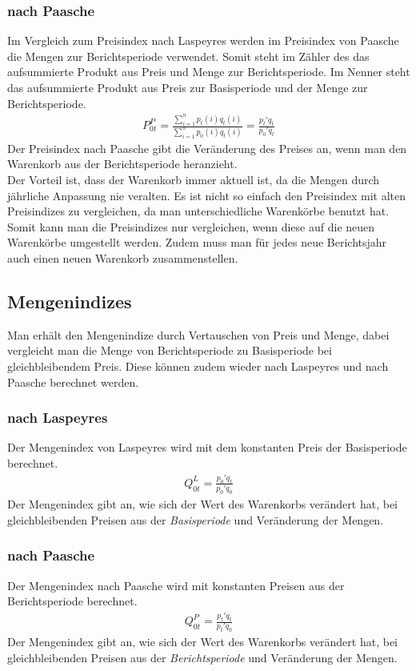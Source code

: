 \documentclass[a4paper]{article}
\begin{document}
\subsubsection{nach Paasche}
Im Vergleich zum Preisindex nach Laspeyres werden im Preisindex von Paasche die Mengen zur Berichtsperiode verwendet. Somit steht im Zähler des das aufsummierte Produkt aus Preis und Menge zur Berichtsperiode. Im Nenner steht das aufsummierte Produkt aus Preis zur Basisperiode und der Menge zur Berichtsperiode. 
\begin{align*}
    P_{0t}^P =\frac{\sum_{i=1}^n p_t(i)q_t(i)}{\sum_{i=1}^n p_0(i)q_t(i)} =\frac{p_t'q_t}{p_0'q_t}
\end{align*}
Der Preisindex nach Paasche gibt die Veränderung des Preises an, wenn man den Warenkorb aus der Berichtsperiode heranzieht. \\
Der Vorteil ist, dass der Warenkorb immer aktuell ist, da die Mengen durch jährliche Anpassung nie veralten. Es ist nicht so einfach den Preisindex mit alten Preisindizes zu vergleichen, da man unterschiedliche Warenkörbe benutzt hat. Somit kann man die Preisindizes nur vergleichen, wenn diese auf die neuen Warenkörbe umgestellt werden. Zudem muss man für jedes neue Berichtsjahr auch einen neuen Warenkorb zusammenstellen.

\subsection{Mengenindizes}
Man erhält den Mengenindize durch Vertauschen von Preis und Menge, dabei vergleicht man die Menge von Berichtsperiode zu Basisperiode bei gleichbleibendem Preis. Diese können zudem wieder nach Laspeyres und nach Paasche berechnet werden.\\

\subsubsection{nach Laspeyres}
Der Mengenindex von Laspeyres wird mit dem konstanten Preis der Basisperiode berechnet.
\begin{align*}
    Q_{0t}^L = \frac{p_0'q_t}{p_0'q_0}
\end{align*}
Der Mengenindex gibt an, wie sich der Wert des Warenkorbs verändert hat, bei gleichbleibenden Preisen aus der \textit{Basisperiode} und Veränderung der Mengen.

\subsubsection{nach Paasche}
Der Mengenindex nach Paasche wird mit konstanten Preisen aus der Berichtsperiode berechnet.
\begin{align*}
    Q_{0t}^P = \frac{p_t'q_t}{p_t'q_0}
\end{align*}
Der Mengenindex gibt an, wie sich der Wert des Warenkorbs verändert hat, bei gleichbleibenden Preisen aus der \textit{Berichtsperiode} und Veränderung der Mengen.
\end{document}
